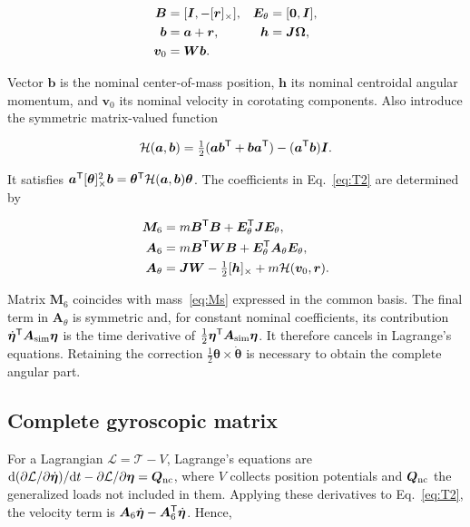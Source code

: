 \begin{align}
\bm B&=[\bm I,-[\bm{r}]_\times],&\bm E_\theta&=[\bm0,\bm I],\nonumber\\
\bm b&=\bm a+\bm r,&\bm h&=\bm J\bm\Omega,\nonumber\\
\bm v_0&=\bm W\bm b.
\end{align}

Vector $\bm b$ is the nominal center-of-mass position, $\bm h$ its nominal centroidal angular momentum, and $\bm v_0$ its nominal velocity in corotating components. Also introduce the symmetric matrix-valued function

\begin{equation}
\mathcal H(\bm a,\bm b)=\tfrac12(\bm a\bm b^\mathsf T+\bm b\bm a^\mathsf T)
-(\bm a^\mathsf T\bm b)\bm I.
\end{equation}

It satisfies $\bm a^\mathsf T[\bm{\theta}]_\times^2\bm b=\bm\theta^\mathsf T\mathcal H(\bm a,\bm b)\bm\theta$. The coefficients in Eq.~\eqref{eq:T2} are determined by

\begin{align}
\bm M_6&=m\bm B^\mathsf T\bm B+\bm E_\theta^\mathsf T\bm J\bm E_\theta,\label{eq:M6}\\
\bm A_6&=m\bm B^\mathsf T\bm W\bm B+\bm E_\theta^\mathsf T\bm A_\theta\bm E_\theta,\nonumber\\
\bm A_\theta&=\bm J\bm W-\tfrac12[\bm{h}]_\times+m\mathcal H(\bm v_0,\bm r).
\label{eq:A6}
\end{align}

Matrix $\bm M_6$ coincides with mass~\eqref{eq:Ms} expressed in the common basis. The final term in $\bm A_\theta$ is symmetric and, for constant nominal coefficients, its contribution $\dot{\bm\eta}^\mathsf T\bm A_{\rm sim}\bm\eta$ is the time derivative of $\tfrac12\bm\eta^\mathsf T\bm A_{\rm sim}\bm\eta$. It therefore cancels in Lagrange's equations. Retaining the correction $\tfrac12\bm\theta\times\dot{\bm\theta}$ is necessary to obtain the complete angular part.

\subsection{Complete gyroscopic matrix}
For a Lagrangian $\mathcal L=\mathcal T-V$, Lagrange's equations are $\mathrm d(\partial\mathcal L/\partial\dot{\bm\eta})/\mathrm d t-\partial\mathcal L/\partial\bm\eta=\bm Q_{\rm nc}$, where $V$ collects position potentials and $\bm Q_{\rm nc}$ the generalized loads not included in them. Applying these derivatives to Eq.~\eqref{eq:T2}, the velocity term is $\bm A_6\dot{\bm\eta}-\bm A_6^\mathsf T\dot{\bm\eta}$. Hence,

